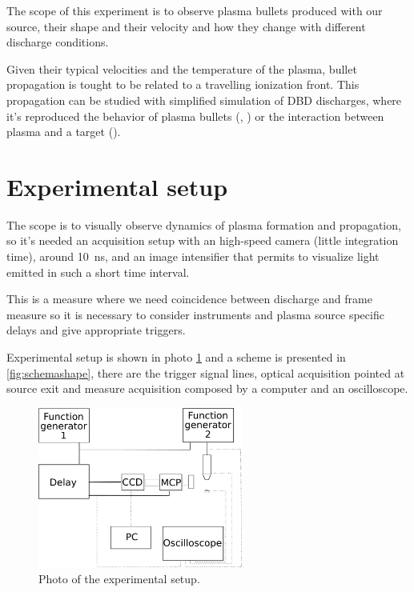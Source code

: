 The scope of this experiment is to observe plasma bullets produced with our source, their shape and their velocity and how they change with different discharge conditions.

Given their typical velocities and the temperature of the plasma, bullet propagation is tought to be related to a travelling ionization front. This propagation can be studied with simplified simulation of DBD discharges, where it's reproduced the behavior of plasma bullets (\cite{doi:10.1063/1.4963115}, \cite{Breden_2012}) or the interaction between plasma and a target (\cite{doi:10.1063/1.4923345}).

\section{Experimental setup}
The scope is to visually observe dynamics of plasma formation and propagation, so it's needed an acquisition setup with an high-speed camera (little integration time), around \SI{10}{\nano\second}, and an image intensifier that permits to visualize light emitted in such a short time interval.

This is a measure where we need coincidence between discharge and frame measure so it is necessary to consider instruments and plasma source specific delays and give appropriate triggers.

Experimental setup is shown in photo \ref{fig:fotosetup} and a scheme is presented in \ref{fig:schemashape}, there are the trigger signal lines, optical acquisition pointed at source exit and measure acquisition composed by a computer and an oscilloscope. 
\begin{figure}
 \centering
 \includegraphics[width=0.6\textwidth]{Images/Shape/acq_ottica.png}
 \caption{Photo of the experimental setup.}
 \label{fig:fotosetup}
\end{figure}


